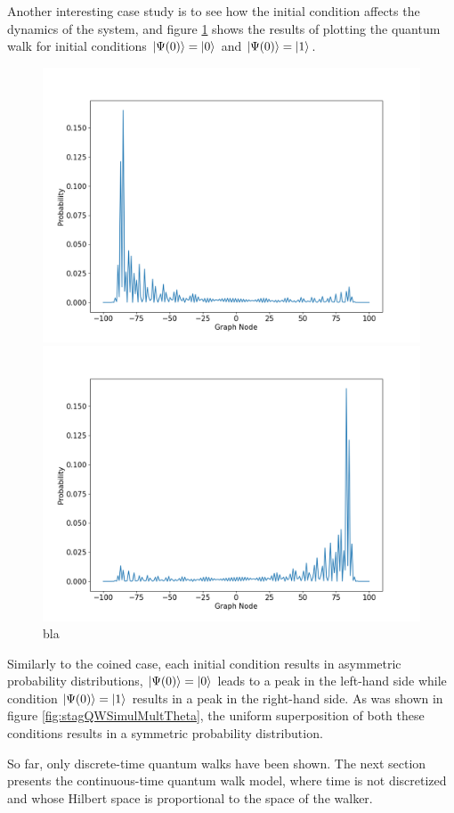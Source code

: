 \documentclass[../../dissertation.tex]{subfiles}
\begin{document}
Another interesting case study is to see how the initial condition affects the
dynamics of the system, and figure \ref{fig:stagQW2InitCond} shows the results
of plotting the quantum walk for initial conditions  $\ket{\Psi(0)}=\ket{0}$
and  $\ket{\Psi(0)}=\ket{1}$.
\begin{figure}[!h]
	\includegraphics[width=\linewidth]{img/StagQuantumWalk/stagqwSingle0.png}
	\caption{$\ket{\Psi(0)}=\ket{0}$}\label{fig:fig6}
	\endminipage\hfill
	\includegraphics[width=\linewidth]{img/StagQuantumWalk/stagqwSingle1.png}
	\caption{$\ket{\Psi(0)}=\ket{1}$}\label{fig:fig7}
	\endminipage\hfill
	\caption{bla}
	\label{fig:stagQW2InitCond}
\end{figure}
Similarly to the coined case, each initial condition results in asymmetric
probability distributions, $\ket{\Psi(0)}=\ket{0}$ leads to a peak  in the
left-hand side while condition $\ket{\Psi(0)}=\ket{1}$ results in a peak in the
right-hand side. As was shown in figure \ref{fig:stagQWSimulMultTheta}, the
uniform superposition of both these conditions results in a symmetric
probability distribution.\par So far, only discrete-time quantum walks have
been shown. The next section presents the continuous-time quantum walk model,
where time is not discretized and whose Hilbert space is proportional to the
space of the walker.

\end{document}
